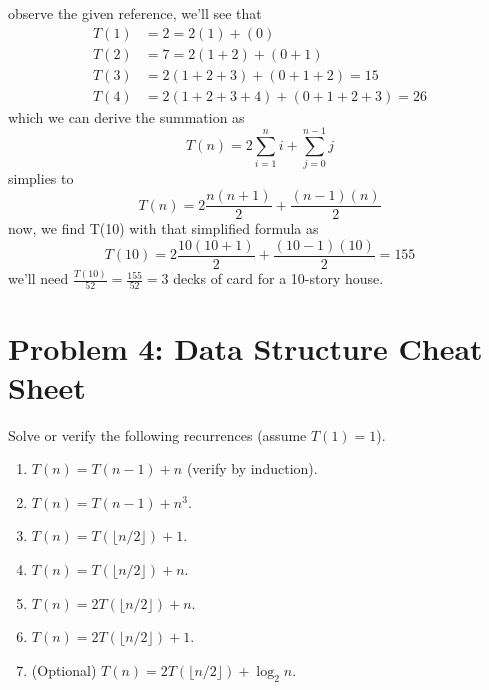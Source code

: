 \medskip
\solution

observe the given reference, we'll see that
\[
\begin{aligned}
T(1) &= 2 = 2(1) + (0)\\
T(2) &= 7 = 2(1+2) + (0+1) \\
T(3) &= 2(1+2+3) + (0+1+2) = 15 \\
T(4) &= 2(1+2+3+4) + (0+1+2+3) = 26
\end{aligned}
\]
which we can derive the summation as
\[
T(n) = 2\sum_{i = 1}^n i + \sum_{j=0}^{n-1} j
\]
simplies to
\[
T(n) = 2\frac{n(n+1)}{2} + \frac{(n-1)(n)}{2}
\]
now, we find T(10) with that simplified formula as
\[
T(10) = 2\frac{10(10+1)}{2} + \frac{(10-1)(10)}{2} = 155
\]
we'll need $\frac{T(10)}{52} = \frac{155}{52} = \boxed{3}$ decks of card for a 10-story house.

\vspace{1em}
\hrulefill

\section*{Problem 4: Data Structure Cheat Sheet}
Solve or verify the following recurrences (assume $T(1)=1$).
\begin{enumerate}[label=\arabic*.]
    \item $T(n) = T(n-1) + n$ (verify by induction).
    \item $T(n) = T(n-1) + n^3$.
    \item $T(n) = T(\lfloor n/2 \rfloor) + 1$.
    \item $T(n) = T(\lfloor n/2 \rfloor) + n$.
    \item $T(n) = 2T(\lfloor n/2 \rfloor) + n$.
    \item $T(n) = 2T(\lfloor n/2 \rfloor) + 1$.
    \item (Optional) $T(n) = 2T(\lfloor n/2 \rfloor) + \log_2 n$.
\end{enumerate}
\medskip
\solution

